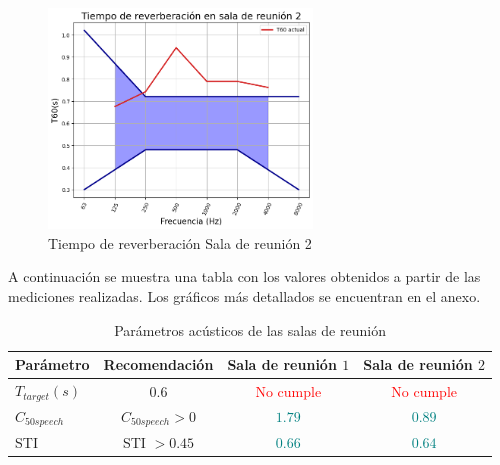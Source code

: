     \begin{figure}[H]
        \centering
        \includegraphics[width=7cm]{Imagenes/DIN/DIN sala reunion 2 actual.png}
        \caption{Tiempo de reverberación Sala de reunión 2}
        \label{fig:Ttarget sala de reunion 2}
    \end{figure}
A continuación se muestra una tabla con los valores obtenidos a partir de las mediciones realizadas. Los gráficos más detallados se encuentran en el anexo.
    \begin{table}[H]
        \centering
        \begin{tabular}{|l|c|c|c|}
        \hline
          \textbf{Parámetro}  & \textbf{Recomendación} & \textbf{Sala de reunión $1$} & \textbf{Sala de reunión $2$}\\ \hline
          $T_{target} (s)$    & $0.6$ & \textcolor{red}{No cumple} & \textcolor{red}{No cumple}\\ \hline
          $C_{50speech}$      & $C_{50speech}>0$ & \textcolor{teal}{$1.79$} & \textcolor{teal}{$0.89$} \\ \hline
          STI & STI $> 0.45$  & \textcolor{teal}{$0.66$} & \textcolor{teal}{$0.64$}\\\hline
        \end{tabular}
        \caption{Parámetros acústicos de las salas de reunión}
        \label{tab: cumplimiento parametros RT salas de reuniones}
    \end{table}
